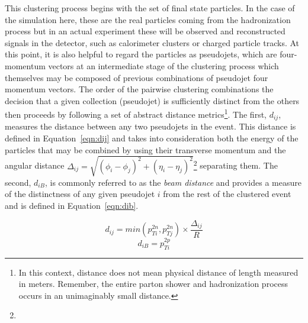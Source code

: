 \documentclass[UKenglish,texlive=2016]{\ATLASLATEXPATH atlasdoc}
\begin{document}
This clustering process begins with the set of final state particles.  In the case of the simulation here, these are the real particles coming from the hadronization process but in an actual experiment these will be observed and reconstructed signals in the detector, such as calorimeter clusters or charged particle tracks.  At this point, it is also helpful to regard the particles as pseudojets, which are four-momentum vectors at an intermediate stage of the clustering process which themselves may be composed of previous combinations of pseudojet four momentum vectors. The order of the pairwise clustering combinations the decision that a given collection (pseudojet) is sufficiently distinct from the others then proceeds by following a set of abstract distance metrics\footnote{In this context, distance does not mean physical distance of length measured in meters.  Remember, the entire parton shower and hadronization process occurs in an unimaginably small distance.}.  The first, $d_{ij}$, measures the distance between any two pseudojets in the event.  This distance is defined in Equation~\ref{eqn:dij} and takes into consideration both the energy of the particles that may be combined by using their transverse momentum \pt and the angular distance $\Delta_{ij}=\sqrt{(\phi_i-\phi_j)^2+(\eta_i-\eta_j)^2}$\footnote{} separating them.  The second, $d_{iB}$, is commonly referred to as the \textit{beam distance} and provides a measure of the distinctness of any given pseudojet $i$ from the rest of the clustered event and is defined in Equation~\ref{eqn:dib}.

\begin{equation}
\label{eqn:dij}
d_{ij}=min(p_{Ti}^{2n},p_{Tj}^{2n})\times \frac{\Delta_{ij}}{R}
\end{equation}
\begin{equation}
\label{eqn:dib}
d_{iB}=p_{Ti}^{2p}
\end{equation}
\end{document}
